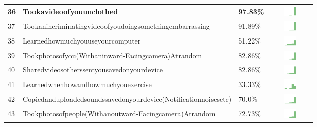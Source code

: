 \begin{table}[t]
\begin{center}
\begin{tabular}{| p{0.5cm} | p{7cm} | p{1cm} | c |}
36 & Tookavideoofyouunclothed & 97.83\% & \includegraphics[width = 2cm, height = 0.5cm]{../tookavideoofyouunclothedFRIENDS} \\ \hline 
37 & Tookanincriminatingvideoofyoudoingsomethingembarrassing & 91.89\% & \includegraphics[width = 2cm, height = 0.5cm]{../tookanincriminatingvideoofyoudoingsomethingembarrassingFRIENDS} \\ \hline 
38 & Learnedhowmuchyouuseyourcomputer & 51.22\% & \includegraphics[width = 2cm, height = 0.5cm]{../learnedhowmuchyouuseyourcomputerFRIENDS} \\ \hline 
39 & Tookphotosofyou(Withaninward-Facingcamera)Atrandom & 82.86\% & \includegraphics[width = 2cm, height = 0.5cm]{../tookphotosofyou(withaninward-facingcamera)atrandomFRIENDS} \\ \hline 
40 & Sharedvideosotherssentyousavedonyourdevice & 82.86\% & \includegraphics[width = 2cm, height = 0.5cm]{../sharedvideosotherssentyousavedonyourdeviceFRIENDS} \\ \hline 
41 & Learnedwhenhowandhowmuchyouexercise & 33.33\% & \includegraphics[width = 2cm, height = 0.5cm]{../learnedwhenhowandhowmuchyouexerciseFRIENDS} \\ \hline 
42 & Copiedanduploadedsoundssavedonyourdevice(Notificationnoisesetc) & 70.0\% & \includegraphics[width = 2cm, height = 0.5cm]{../copiedanduploadedsoundssavedonyourdevice(notificationnoisesetc)FRIENDS} \\ \hline 
43 & Tookphotosofpeople(Withanoutward-Facingcamera)Atrandom & 72.73\% & \includegraphics[width = 2cm, height = 0.5cm]{../tookphotosofpeople(withanoutward-facingcamera)atrandomFRIENDS} \\ \hline 

\end{tabular}
\end{center}
\end{table}
